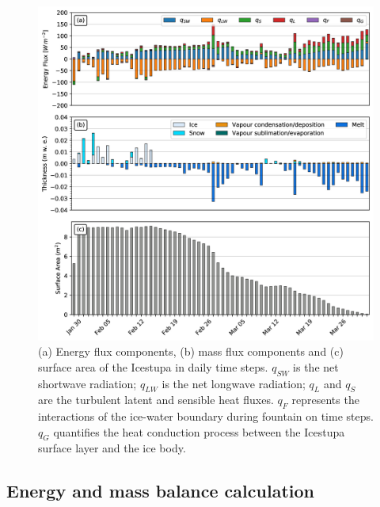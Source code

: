 \documentclass[utf8]{frontiersSCNS} %
\begin{document}
  \begin{figure} \begin{center} \includegraphics[width=\linewidth]{Figures/Figure_6.jpg} \end{center} \caption{(a)
    Energy flux components, (b) mass flux components and (c) surface area of the Icestupa in daily time steps. $q_{SW}$
    is the net shortwave radiation; $q_{LW}$ is the net longwave radiation; $q_{L}$ and $q_{S}$ are the turbulent latent
    and sensible heat fluxes. $q_{F}$ represents the interactions of the ice-water boundary during fountain on time
steps.  $q_{G}$ quantifies the heat conduction process between the Icestupa surface layer and the ice body. }
\label{fig:EB} \end{figure}
  

\subsection{Energy and mass balance calculation}
\end{document}
